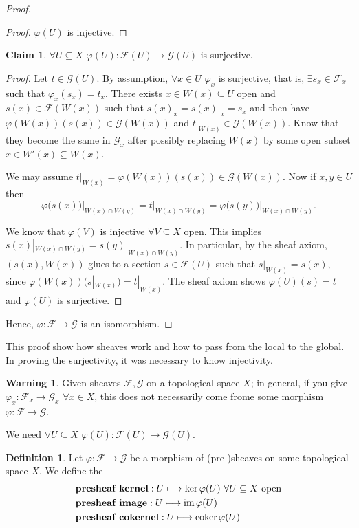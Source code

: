 \documentclass[12pt]{article}
\DeclareMathOperator{\im}{im}
\DeclareMathOperator{\coker}{coker}
\theoremstyle{definition}
\newtheorem*{definition}{Definition}
\newtheorem*{warning}{Warning}
\newtheorem*{claim}{Claim}
\theoremstyle{remark}
\begin{document}
\begin{proof}
\begin{itemize}
\begin{proof}
$\varphi(U)$ is injective.
\end{proof}

\begin{claim}
$\forall U\subseteq X$ $\varphi(U):\mathcal{F}(U)\rightarrow\mathcal{G}(U)$ is surjective.
\end{claim}

\begin{proof}
Let $t\in\mathcal{G}(U)$. By assumption, $\forall x\in U$ $\varphi_x$ is surjective, that is, $\exists s_x\in\mathcal{F}_x$ such that $\varphi_x(s_x)=t_x$. There exists $x\in W(x)\subseteq U$ open and $s(x)\in\mathcal{F}(W(x))$ such that $s(x)_x=s(x)|_x=s_x$ and then have $\varphi(W(x))(s(x))\in\mathcal{G}(W(x))$ and $t|_{W(x)}\in\mathcal{G}(W(x))$. Know that they become the same in $\mathcal{G}_x$ after possibly replacing $W(x)$ by some open subset $x\in W'(x)\subseteq W(x)$.

We may assume $t|_{W(x)}=\varphi(W(x))(s(x))\in\mathcal{G}(W(x))$. Now if $x,y\in U$ then
\[\varphi\big(s(x)\big)\big|_{W(x)\cap W(y)}=t|_{W(x)\cap W(y)}=\varphi\big(s(y)\big)\big|_{W(x)\cap W(y)}.\]

We know that $\varphi(V)$ is injective $\forall V\subseteq X$ open. This implies $s(x)|_{W(x)\cap W(y)}=s(y)|_{W(x)\cap W(y)}$. In particular, by the sheaf axiom, $(s(x),W(x))$ glues to a section $s\in\mathcal{F}(U)$ such that $s|_{W(x)}=s(x)$, since $\varphi(W(x))(s|_{W(x)})=t|_{W(x)}$. The sheaf axiom shows $\varphi(U)(s)=t$ and $\varphi(U)$ is surjective.
\end{proof}
\end{itemize}
Hence, $\varphi:\mathcal{F}\rightarrow\mathcal{G}$ is an isomorphism.
\end{proof}
This proof show how sheaves work and how to pass from the local to the global. In proving the surjectivity, it was necessary to know injectivity.

\begin{warning}
Given sheaves $\mathcal{F},\mathcal{G}$ on a topological space $X$; in general, if you give $\varphi_x:\mathcal{F}_x\rightarrow\mathcal{G}_x$ $\forall x\in X$, this does not necessarily come frome some morphism $\varphi:\mathcal{F}\rightarrow\mathcal{G}$.

We need $\forall U\subseteq X$ $\varphi(U):\mathcal{F}(U)\rightarrow\mathcal{G}(U)$.
\end{warning}

\begin{definition}
Let $\varphi:\mathcal{F}\rightarrow\mathcal{G}$ be a morphism of (pre-)sheaves on some topological space $X$. We define the
\begin{align*}
&\text{\textbf{presheaf kernel}}:U\longmapsto\ker\varphi(U)\ \forall U\subseteq X\text{ open}\\
&\text{\textbf{presheaf image}}:U\longmapsto\im\varphi(U)\\
&\text{\textbf{presheaf cokernel}}:U\longmapsto\coker\varphi(U)
\end{align*}
\end{definition}
\end{document}
